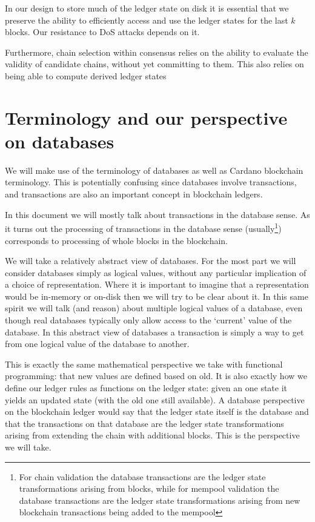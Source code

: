 \documentclass[11pt,a4paper]{article}
\begin{document}
In our design to store much of the ledger state on disk it is essential that we
preserve the ability to efficiently access and use the ledger states for the
last $k$ blocks. Our resistance to DoS attacks depends on it.

Furthermore, chain selection within consensus relies on the ability to evaluate
the validity of candidate chains, without yet committing to them. This also
relies on being able to compute derived ledger states

\section{Terminology and our perspective on databases}
\label{terminology}

We will make use of the terminology of databases as well as Cardano blockchain
terminology. This is potentially confusing since databases involve transactions,
and transactions are also an important concept in blockchain ledgers.

In this document we will mostly talk about transactions in the database sense.
As it turns out the processing of transactions in the database sense
(usually\footnote{For chain validation the database transactions are the ledger
state transformations arising from blocks, while for mempool validation the
database transactions are the ledger state transformations arising from new
blockchain  transactions being added to the mempool}) corresponds to processing
of whole blocks in the blockchain.

We will take a relatively abstract view of databases. For the most part we will
consider databases simply as logical values, without any particular implication
of a choice of representation. Where it is important to imagine that a
representation would be in-memory or on-disk then we will try to be clear about
it. In this same spirit we will talk (and reason) about multiple logical
values of a database, even though real databases typically only allow access
to the `current' value of the database. In this abstract view of databases a
transaction is simply a way to get from one logical value of the database to
another.

This is exactly the same mathematical perspective we take with functional
programming: that new values are defined based on old. It is also exactly how
we define our ledger rules as functions on the ledger state: given an one state
it yields an updated state (with the old one still available). A database
perspective on the blockchain ledger would say that the ledger state itself is
the database and that the transactions on that database are the ledger state
transformations arising from extending the chain with additional blocks. This
is the perspective we will take.
\end{document}
